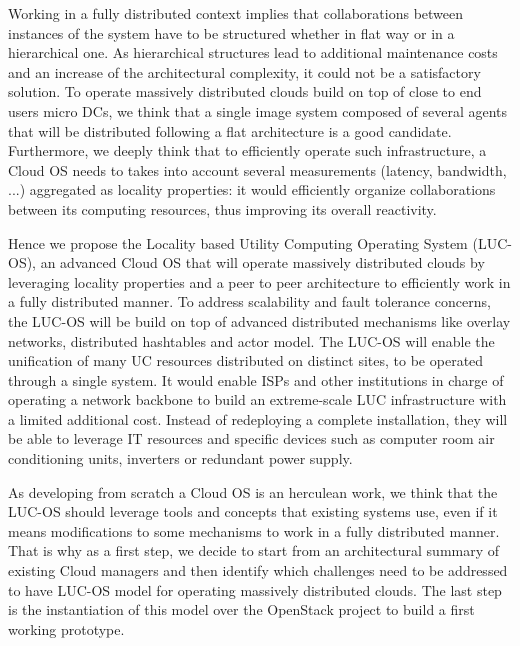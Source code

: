Working in a fully distributed context implies that collaborations between 
instances of the system have to be structured whether in flat way or in a 
hierarchical one. As hierarchical structures lead to additional maintenance 
costs and an increase of the architectural complexity, it could not be a 
satisfactory solution. To operate massively distributed clouds build on top of 
close to end users micro DCs, we think that a single image system composed of 
several agents that will be distributed following a flat architecture is a good
candidate. Furthermore, we deeply think that to efficiently operate such 
infrastructure, a Cloud OS needs to takes into account several measurements 
(latency, bandwidth, ...) aggregated as locality properties: it would 
efficiently organize collaborations between its computing resources, thus 
improving its overall reactivity. 

Hence we propose the Locality based Utility Computing Operating System (LUC-OS),
an advanced Cloud OS that will operate massively distributed clouds by 
leveraging locality properties and a peer to peer architecture to efficiently 
work in a fully distributed manner. To address scalability and fault tolerance 
concerns, the LUC-OS will be build on top of advanced distributed mechanisms 
like overlay networks, distributed hashtables and actor model. The LUC-OS will 
enable the unification of many UC resources distributed on distinct sites, to be
operated through a single system. It would enable ISPs and other institutions in
charge of operating a network backbone to build an extreme-scale LUC 
infrastructure with a limited additional cost. Instead of redeploying a complete
installation, they will be able to leverage IT resources and specific devices 
such as computer room air conditioning units, inverters or redundant power 
supply.

As developing from scratch a Cloud OS is an herculean work, we think that the 
LUC-OS should leverage tools and concepts that existing systems use, even if 
it means modifications to some mechanisms to work in a fully distributed manner.
That is why as a first step, we decide to start from an architectural summary of 
existing Cloud managers and then identify which challenges need to be addressed
to have LUC-OS model for operating massively distributed clouds. The last step 
is the instantiation of this model over the OpenStack project to build a first
working prototype.

